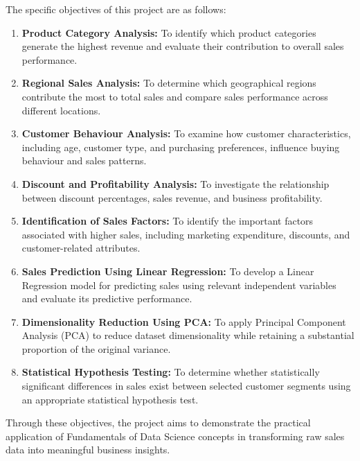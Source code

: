 \documentclass[12pt,a4paper]{report}
\begin{document}
The specific objectives of this project are as follows:

\begin{enumerate}

    \item \textbf{Product Category Analysis:}
    To identify which product categories generate
    the highest revenue and evaluate their
    contribution to overall sales performance.

    \item \textbf{Regional Sales Analysis:}
    To determine which geographical regions
    contribute the most to total sales and
    compare sales performance across different
    locations.

    \item \textbf{Customer Behaviour Analysis:}
    To examine how customer characteristics,
    including age, customer type, and purchasing
    preferences, influence buying behaviour
    and sales patterns.

    \item \textbf{Discount and Profitability Analysis:}
    To investigate the relationship between
    discount percentages, sales revenue, and
    business profitability.

    \item \textbf{Identification of Sales Factors:}
    To identify the important factors associated
    with higher sales, including marketing
    expenditure, discounts, and customer-related
    attributes.

    \item \textbf{Sales Prediction Using Linear Regression:}
    To develop a Linear Regression model for
    predicting sales using relevant independent
    variables and evaluate its predictive
    performance.

    \item \textbf{Dimensionality Reduction Using PCA:}
    To apply Principal Component Analysis (PCA)
    to reduce dataset dimensionality while
    retaining a substantial proportion of
    the original variance.

    \item \textbf{Statistical Hypothesis Testing:}
    To determine whether statistically significant
    differences in sales exist between selected
    customer segments using an appropriate
    statistical hypothesis test.

\end{enumerate}

Through these objectives, the project aims to
demonstrate the practical application of
Fundamentals of Data Science concepts in
transforming raw sales data into meaningful
business insights.
\end{document}
